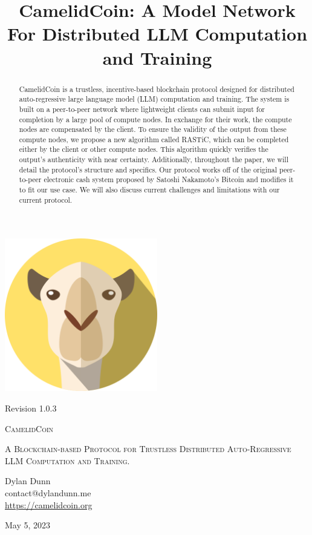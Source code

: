 \documentclass{article}
\title{CamelidCoin: A Model Network For Distributed LLM Computation and Training}
\begin{document}

\begin{titlepage}
    \centering
    \includegraphics[width=0.5\textwidth]{logoLarge.png}\par\vspace{.5cm}
    {\small Revision 1.0.3 \\}
    \vspace{1cm}
    {\fontsize{40}{48}\selectfont\scshape CamelidCoin\par}
    \vspace{1cm}
    {\scshape\Large A Blockchain-based Protocol for Trustless Distributed Auto-Regressive LLM Computation and Training. \par}
    \vspace{2cm}
    {\Large Dylan Dunn \\}
    {\Large contact@dylandunn.me \\}
    \vspace{1cm}
    \url{https://camelidcoin.org}
    \vspace{0.5cm}
    \vfill
    {\large May 5, 2023\par}
  \end{titlepage}

\begin{abstract}
CamelidCoin is a trustless, incentive-based blockchain protocol designed for distributed auto-regressive large language model (LLM) computation and training. 
The system is built on a peer-to-peer network where lightweight clients can submit input for completion by a large pool of compute nodes. 
In exchange for their work, the compute nodes are compensated by the client. 
To ensure the validity of the output from these compute nodes, we propose a new algorithm called \ac{RASTiC}, which can be completed either by the client or other compute nodes. 
This algorithm quickly verifies the output's authenticity with near certainty. 
Additionally, throughout the paper, we will detail the protocol's structure and specifics.
Our protocol works off of the original peer-to-peer electronic cash system proposed by Satoshi Nakamoto's Bitcoin and modifies it to fit our use case. 
We will also discuss current challenges and limitations with our current protocol.
\end{abstract}
\end{document}
